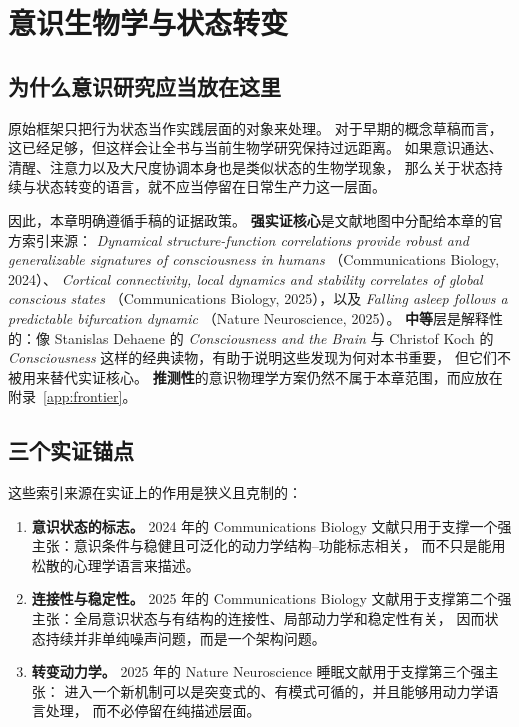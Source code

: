 \chapter{意识生物学与状态转变}
\label{ch:consciousness-biology}

\section{为什么意识研究应当放在这里}

原始框架只把行为状态当作实践层面的对象来处理。
对于早期的概念草稿而言，这已经足够，但这样会让全书与当前生物学研究保持过远距离。
如果意识通达、清醒、注意力以及大尺度协调本身也是类似状态的生物学现象，
那么关于状态持续与状态转变的语言，就不应当停留在日常生产力这一层面。

因此，本章明确遵循手稿的证据政策。
\textbf{强实证核心}是文献地图中分配给本章的官方索引来源：
\emph{Dynamical structure-function correlations provide robust and generalizable signatures of consciousness in humans}
（Communications Biology, 2024）、
\emph{Cortical connectivity, local dynamics and stability correlates of global conscious states}
（Communications Biology, 2025），以及
\emph{Falling asleep follows a predictable bifurcation dynamic}
（Nature Neuroscience, 2025）。
\textbf{中等}层是解释性的：像 Stanislas Dehaene 的 \emph{Consciousness and the Brain}
与 Christof Koch 的 \emph{Consciousness} 这样的经典读物，有助于说明这些发现为何对本书重要，
但它们不被用来替代实证核心。
\textbf{推测性}的意识物理学方案仍然不属于本章范围，而应放在附录~\ref{app:frontier}。

\section{三个实证锚点}

这些索引来源在实证上的作用是狭义且克制的：
\begin{enumerate}[nosep]
  \item \textbf{意识状态的标志。} 2024 年的 Communications
        Biology 文献只用于支撑一个强主张：意识条件与稳健且可泛化的动力学结构--功能标志相关，
        而不只是能用松散的心理学语言来描述。
  \item \textbf{连接性与稳定性。} 2025 年的 Communications Biology
        文献用于支撑第二个强主张：全局意识状态与有结构的连接性、局部动力学和稳定性有关，
        因而状态持续并非单纯噪声问题，而是一个架构问题。
  \item \textbf{转变动力学。} 2025 年的 Nature Neuroscience 睡眠文献用于支撑第三个强主张：
        进入一个新机制可以是突变式的、有模式可循的，并且能够用动力学语言处理，
        而不必停留在纯描述层面。
\end{enumerate}

